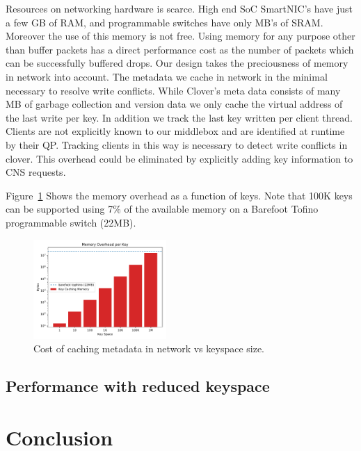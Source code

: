 Resources on networking hardware is scarce. High end SoC SmartNIC's
have just a few GB of RAM, and programmable switches have only MB's of
SRAM. Moreover the use of this memory is not free. Using memory for
any purpose other than buffer packets has a direct performance cost as
the number of packets which can be successfully buffered drops. Our
design takes the preciousness of memory in network into account. The
metadata we cache in network in the minimal necessary to resolve write
conflicts. While Clover's meta data consists of many MB of garbage
collection and version data we only cache the virtual address of the
last write per key. In addition we track the last key written per
client thread. Clients are not explicitly known to our middlebox and
are identified at runtime by their QP. Tracking clients in this way is
necessary to detect write conflicts in clover. This overhead could be
eliminated by explicitly adding key information to CNS requests.

Figure~\ref{fig:memory} Shows the memory overhead as a function of
keys. Note that 100K keys can be supported using 7\% of the available
memory on a Barefoot Tofino programmable switch (22MB).

\begin{figure}
    \includegraphics[width=0.45\textwidth]{fig/memory.pdf}
    \caption{Cost of caching metadata in network vs keyspace size.}
    \label{fig:memory}
\end{figure}

\subsection{Performance with reduced keyspace}

\section{Conclusion}









